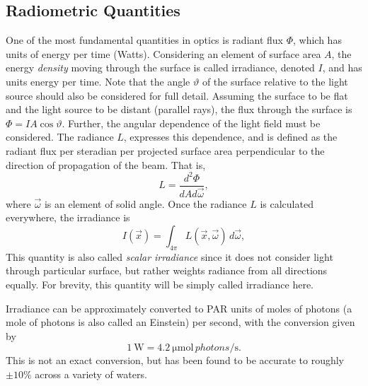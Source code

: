 \subsection{Radiometric Quantities}
One of the most fundamental quantities in optics is radiant flux $\Phi$, which has units of energy per time (Watts).
Considering an element of surface area $A$, the energy \textit{density} moving through the surface is called irradiance, denoted $I$, and has units energy per time.
Note that the angle $\vartheta$ of the surface relative to the light source should also be considered for full detail. Assuming the surface to be flat and the light source to be distant (parallel rays), the flux through the surface is $\Phi=IA\cos\vartheta$.
Further, the angular dependence of the light field must be considered.
The radiance $L$, expresses this dependence, and is defined as the radiant flux per steradian per projected surface area perpendicular to the direction of propagation of the beam.
That is,
\begin{equation*}
	L = \frac{d^2\Phi}{dA d\vec{\omega}},
\end{equation*}
where $\vec{\omega}$ is an element of solid angle.
Once the radiance $L$ is calculated everywhere, the irradiance is
\begin{equation*}
  I(\vec{x}) = \int_{4\pi}L(\vec{x},\vec{\omega})\, d\vec{\omega},
\end{equation*}
This quantity is also called \textit{scalar irradiance} since it does not consider light through particular surface, but rather weights radiance from all directions equally.
For brevity, this quantity will be simply called irradiance here.

Irradiance can be approximately converted to PAR units of moles of photons (a mole of photons is also called an Einstein) per second, with the conversion \cite{mobley_light_1994} given by
\begin{equation}
  \SI{1}{\W} = \SI{4.2}{\micro\mole \,photons\per\second}.
  \label{eqn:watts_photons}
\end{equation}
This is not an exact conversion, but has been found to be accurate to roughly $\pm10\%$ across a variety of waters.


